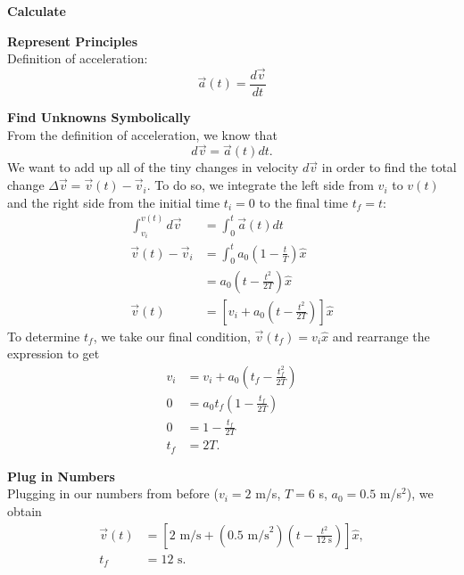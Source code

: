 \documentclass[]{article}
\begin{document}
\begin{TeacherMargin}
\noindent\textbf{Calculate}

\noindent\textbf{Represent Principles} \\
Definition of acceleration:
\[
\vec{a}(t) = \frac{d\vec{v}}{dt}
\]

\noindent\textbf{Find Unknowns Symbolically} \\
From the definition of acceleration, we know that
\[
d\vec{v} = \vec{a}(t)dt.
\]
We want to add up all of the tiny changes in velocity $d\vec{v}$ in order to find the total change $\Delta\vec{v}=\vec{v}(t)-\vec{v}_{i}$. To do so, we integrate the left side from $v_{i}$ to $v(t)$ and the right side from the initial time $t_{i}=0$ to the final time $t_{f}=t$:
\[
\begin{split}
	\int_{v_{i}}^{v(t)}d\vec{v} & = \int_{0}^{t}\vec{a}(t)dt \\
	\vec{v}(t)-\vec{v}_{i} & = \int_{0}^{t} a_{0}\left(1-\frac{t}{T}\right)\hat{x} \\
	& = a_{0}\left(t-\frac{t^{2}}{2T}\right)\hat{x} \\
	\vec{v}(t) & = \left[v_{i} + a_{0}\left(t-\frac{t^{2}}{2T}\right)\right]\hat{x}
\end{split}
\]
To determine $t_{f}$, we take our final condition, $\vec{v}(t_{f}) = v_{i}\hat{x}$ and rearrange the expression to get
\[
\begin{split}
	v_{i} & = v_{i} + a_{0}\left(t_{f}-\frac{t_{f}^{2}}{2T}\right) \\
	0 & = a_{0}t_{f}\left(1-\frac{t_{f}}{2T}\right) \\
	0 & = 1-\frac{t_{f}}{2T} \\
	t_{f} & = 2T.
\end{split}
\]

\noindent\textbf{Plug in Numbers} \\
Plugging in our numbers from before ($v_{i}=2$ m/s, $T=6$ s, $a_{0}=0.5$ m/s$^{2}$), we obtain
\[
\begin{split}
	\vec{v}(t) & = \left[2\text{ m/s} + (0.5\text{ m/s}^{2})\left(t-\frac{t^{2}}{12\text{ s}}\right)\right]\hat{x}, \\
	t_{f} & = 12\text{ s}.
\end{split}
\]

\end{TeacherMargin}
\end{document}
